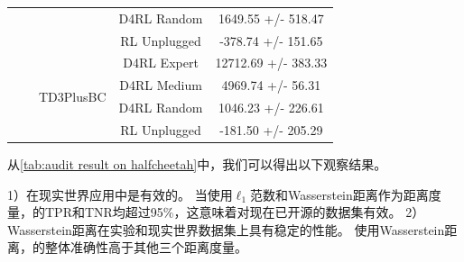 \begin{table}[!ht]
\begin{tabular}{ccccc}
                                   &                       &                            & D4RL   Random        & 1649.55 +/- 518.47         \\
                                   &                       &                            & RL Unplugged         & -378.74 +/- 151.65         \\ \cline{3-5} 
                                   &                       & \multirow{4}{*}{TD3PlusBC} & D4RL   Expert        & 12712.69 +/- 383.33        \\
                                   &                       &                            & D4RL   Medium        & 4969.74 +/- 56.31          \\
                                   &                       &                            & D4RL   Random        & 1046.23 +/- 226.61         \\
                                   &                       &                            & RL Unplugged         & -181.50 +/- 205.29         \\ \bottomrule
    \end{tabular}
\end{table}

从\autoref{tab:audit result on halfcheetah}中，我们可以得出以下观察结果。

1）\sysnameo 在现实世界应用中是有效的。
当使用$\ell_1$范数和Wasserstein距离作为距离度量，\sysnameo 的TPR和TNR均超过95\%，这意味着\sysnameo 对现在已开源的数据集有效。
2）Wasserstein距离在实验和现实世界数据集上具有稳定的性能。
使用Wasserstein距离，\sysnameo 的整体准确性高于其他三个距离度量。


